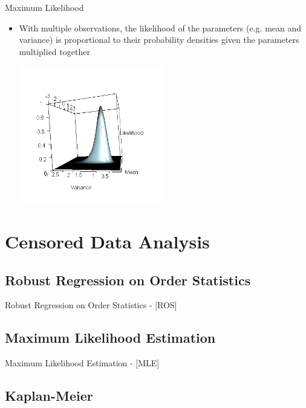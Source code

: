 \documentclass{beamer}
\begin{document}
\begin{frame}{Maximum Likelihood}
\begin{itemize}
\item With multiple observations, the likelihood of the parameters (e.g. mean and variance) is proportional to their probability densities given the parameters multiplied together
\begin{center}
\includegraphics[height=6cm]{Figure8}
\end{center}
\end{itemize}
\end{frame}


\section{Censored Data Analysis}


\subsection{Robust Regression on Order Statistics}

\begin{frame}{Robust Regression on Order Statistics - [ROS] }

\end{frame}


\subsection{Maximum Likelihood Estimation}

\begin{frame}{Maximum Likelihood Estimation - [MLE] }

\end{frame}


\subsection{Kaplan-Meier}
\end{document}
